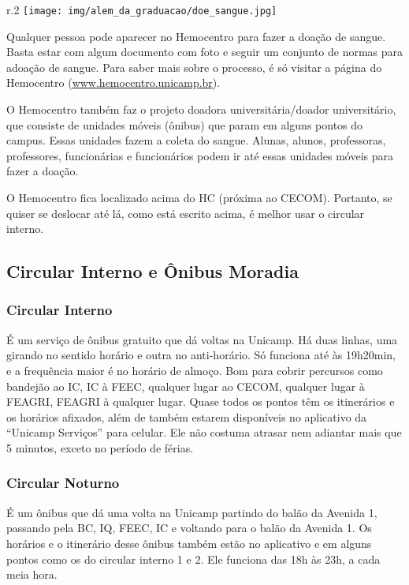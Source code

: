 \begin{wrapfigure}{r}{.2\textwidth}
  \centering
  \texttt{[image: img/alem\_da\_graduacao/doe\_sangue.jpg]}
\end{wrapfigure}

Qualquer pessoa pode aparecer no Hemocentro para fazer a doação de sangue.
Basta estar com algum documento com foto e seguir um conjunto de normas para
adoação de sangue. Para saber mais sobre o processo, é só visitar a página do
Hemocentro (\url{www.hemocentro.unicamp.br}).

O Hemocentro também faz o projeto doadora universitária/doador universitário,
que consiste de unidades móveis (ônibus) que param em alguns pontos do campus.
Essas unidades fazem a coleta do sangue. Alunas, alunos, professoras,
professores, funcionárias e funcionários podem ir até essas unidades móveis
para fazer a doação.

O Hemocentro fica localizado acima do HC (próxima ao CECOM). Portanto, se
quiser se deslocar até lá, como está escrito acima, é melhor usar o circular
interno.

\subsection{Circular Interno e Ônibus Moradia}

\subsubsection{Circular Interno}
É um serviço de ônibus gratuito que dá voltas na Unicamp. Há duas linhas, uma
girando no sentido horário e outra no anti-horário. Só funciona até às
19h20min, e a frequência maior é no horário de almoço. Bom para cobrir
percursos como bandejão ao IC, IC à FEEC, qualquer lugar ao CECOM, qualquer
lugar à FEAGRI, FEAGRI à qualquer lugar. Quase todos os pontos têm os
itinerários e os horários afixados, além de também estarem disponíveis no
aplicativo da ``Unicamp Serviços'' para celular. Ele não costuma atrasar nem
adiantar mais que 5 minutos, exceto no período de férias.

\subsubsection{Circular Noturno}
É um ônibus que dá uma volta na Unicamp partindo do balão da Avenida 1,
passando pela BC, IQ, FEEC, IC e voltando para o balão da Avenida 1. Os
horários e o itinerário desse ônibus também estão no aplicativo e em alguns
pontos como os do circular interno 1 e 2. Ele funciona das 18h às 23h, a cada
meia hora.

